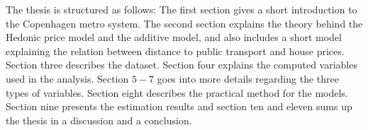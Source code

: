 The thesis is structured as follows: The first section gives a short
introduction to the Copenhagen metro system. The second section explains the 
theory behind the Hedonic price model and the additive model, and also includes
a short model explaining the relation between distance to public transport and
house prices. Section three describes the dataset. Section four explains the 
computed variables used in the analysis. Section $5-7$ goes into more details regarding the three 
types of variables. Section eight describes the practical method for the models. 
Section nine presents the estimation results and section ten and eleven 
sums up the thesis in a discussion and a conclusion. 
